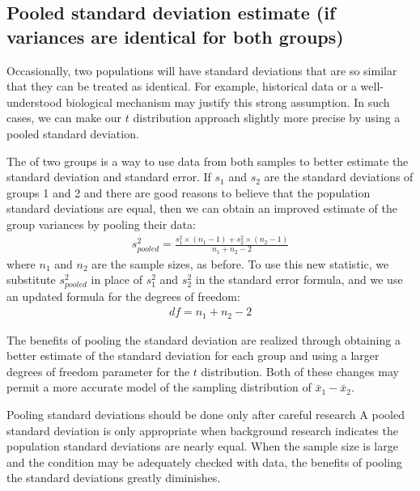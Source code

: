 
\subsection{Pooled standard deviation estimate (if variances are identical for both groups)}
\label{pooledStandardDeviations}

Occasionally, two populations will have standard deviations that are so similar that they can be treated as identical. For example, historical data or a well-understood biological mechanism may justify this strong assumption. In such cases, we can make our $t$ distribution approach slightly more precise by using a pooled standard deviation.

The  of two groups is a way to use data from both samples to better estimate the standard deviation and standard error. If $s_1^{}$ and $s_2^{}$ are the standard deviations of groups 1 and 2 and there are good reasons to believe that the population standard deviations are equal, then we can obtain an improved estimate of the group variances by pooling their data:
\begin{align*}
s_{pooled}^2 = \frac{s_1^2\times (n_1-1) + s_2^2\times (n_2-1)}{n_1 + n_2 - 2}
\end{align*}
where $n_1$ and $n_2$ are the sample sizes, as before. To use this new statistic, we substitute $s_{pooled}^2$ in place of $s_1^2$ and $s_2^2$ in the standard error formula, and we use an updated formula for the degrees of freedom:
\begin{align*}
df = n_1 + n_2 - 2
\end{align*}

The benefits of pooling the standard deviation are realized through obtaining a better estimate of the standard deviation for each group and using a larger degrees of freedom parameter for the $t$ distribution. Both of these changes may permit a more accurate model of the sampling distribution of $\bar{x}_1 - \bar{x}_2$.

{Pooling standard deviations should be done only after careful research}
{A pooled standard deviation is only appropriate when background research indicates the population standard deviations are nearly equal. When the sample size is large and the condition may be adequately checked with data, the benefits of pooling the standard deviations greatly diminishes.}

